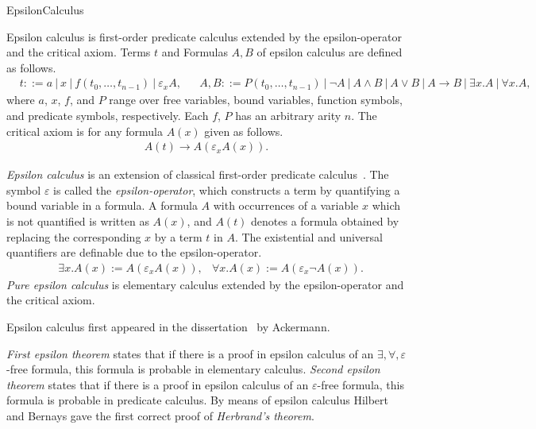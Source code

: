 \begin{entry}{EpsilonCalculus}  


\begin{calculus}

Epsilon calculus is first-order predicate calculus extended by the
epsilon-operator and the critical axiom.  Terms $t$ and Formulas $A,
B$ of epsilon calculus are defined as follows.
\begin{align*}
  & t ::= a ~|~ x ~|~ f(t_0, \ldots, t_{n-1}) ~|~ \varepsilon_x A, 
  && A, B ::= P(t_0, \ldots, t_{n-1}) ~|~ \neg A ~|~ A \land B ~|~ A \lor B ~|~ A \to B ~|~ \exists x. A ~|~ \forall x. A,
\end{align*}
where $a$, $x$, $f$, and $P$ range over free variables, bound
variables, function symbols, and predicate symbols, respectively.
Each $f$, $P$ has an arbitrary arity $n$.
The critical axiom is for any formula $A(x)$ given as follows.
\begin{align*}
  A(t) \to A(\varepsilon_xA(x)).
\end{align*}
\end{calculus}

\begin{clarifications}
  \emph{Epsilon calculus} is an extension of classical first-order
  predicate
  calculus~\cite{HilbertBernays1939,MoserZach06,AvigadZach13}.  The
  symbol $\varepsilon$ is called the \emph{epsilon-operator}, which
  constructs a term by quantifying a bound variable in a formula.  A
  formula $A$ with occurrences of a variable $x$ which is not
  quantified is written as $A(x)$, and $A(t)$ denotes a formula
  obtained by replacing the corresponding $x$ by a term $t$ in $A$.
  The existential and universal quantifiers are definable due to the
  epsilon-operator.
\begin{align*}
  & \exists x. A(x) := A(\varepsilon_x A(x)), & \forall x. A(x) := A(\varepsilon_x \neg A(x)).
\end{align*}
\emph{Pure epsilon calculus} is elementary calculus extended by the
epsilon-operator and the critical axiom.

\end{clarifications}

\begin{history}
Epsilon calculus first appeared in the
dissertation~\cite{Ackermann1924} by Ackermann.
\end{history}

\begin{technicalities}
\emph{First epsilon theorem} states that if there is a proof in
epsilon calculus of an $\exists,\forall,\varepsilon$-free formula,
this formula is probable in elementary calculus.  \emph{Second epsilon
  theorem} states that if there is a proof in epsilon calculus of an
$\varepsilon$-free formula, this formula is probable in predicate
calculus.  By means of epsilon calculus Hilbert and Bernays gave the
first correct proof of \emph{Herbrand's theorem}.
\end{technicalities}



\end{entry}
